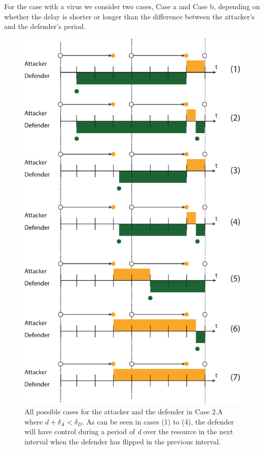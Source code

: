 For the case with a virus we consider two cases, Case a and Case b, depending on whether the delay is shorter or longer than the difference between the attacker's and the defender's period.  \\

\begin{figure}[hbtp]
\centering
\includegraphics[scale=0.7]{../../doc/template/Images/FlipIt2.pdf}
\caption{All possible cases for the attacker and the defender in Case 2.A where $d + \delta_{A} < \delta_{D}$. As can be seen in cases (1) to (4), the defender will have control during a period of \textit{d} over the resource in the next interval when the defender has flipped in the previous interval.}
\label{fig:case2}
\end{figure}

